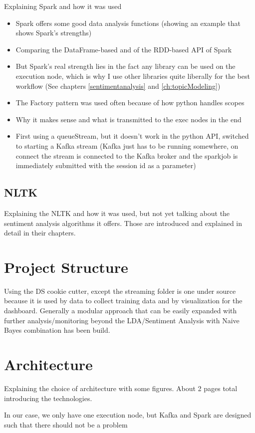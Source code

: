 Explaining Spark and how it was used
\begin{itemize}
    \item
    Spark offers some good data analysis functions (showing an example that shows Spark's strengths) %
    \item
    Comparing the DataFrame-based and of the RDD-based API of Spark
    \item
    But Spark's real strength lies in the fact any library can be used on the execution node, which is why I use other libraries quite liberally for the best workflow (See chapters \ref{sentimentanalysis} and \ref{ch:topicModeling})
    \item
    The Factory pattern was used often because of how python handles scopes
    \item
    Why it makes sense and what is transmitted to the exec nodes in the end
    \item
    First using a queueStream, but it doesn’t work in the python API, switched to starting a Kafka stream (Kafka just has to be running somewhere, on connect the stream is connected to the Kafka broker and the sparkjob is immediately submitted with the session id as a parameter)
\end{itemize}

\subsection{NLTK}
\label{subsec:nltk}

Explaining the NLTK and how it was used, but not yet talking about the sentiment analysis algorithms it offers.
Those are introduced and explained in detail in their chapters.

\section{Project Structure}
\label{sec:projectStructure}


Using the DS cookie cutter, except the streaming folder is one under source because it is used by data to collect training data and by visualization for the dashboard.
Generally a modular approach that can be easily expanded with further analysis/monitoring beyond the LDA/Sentiment Analysis with Naive Bayes combination has been build.


\section{Architecture}
\label{sec:architecture}

Explaining the choice of architecture with some figures.
About 2 pages total introducing the technologies.


In our case, we only have one execution node, but Kafka and Spark are designed such that there should not be a problem
\pagebreak[2]